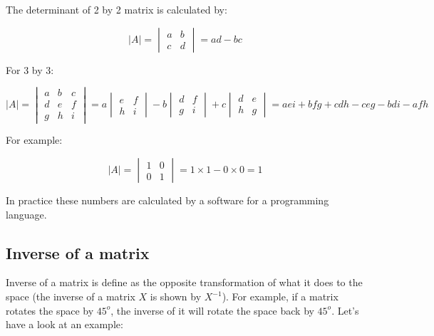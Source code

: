 \documentclass[
]{book}
\theoremstyle{definition}
\theoremstyle{definition}
\theoremstyle{definition}
\theoremstyle{remark}
\begin{document}
The determinant of 2 by 2 matrix is calculated by:

\[|A|=\begin{vmatrix} a & b \\ c & d \end{vmatrix}=
  ad-bc\]

For 3 by 3:

\[|A|=\begin{vmatrix} a & b &c \\ d & e & f\\g & h &i \end{vmatrix}=
  a\begin{vmatrix} e & f \\ h & i \end{vmatrix}-b\begin{vmatrix} d & f \\ g & i \end{vmatrix}+c\begin{vmatrix} d & e \\ h & g \end{vmatrix}=
  aei+bfg+cdh-ceg-bdi-afh\]

For example:

\[|A|=\begin{vmatrix} 1 & 0\\ 0 & 1 \end{vmatrix}=
  1 \times 1-0 \times 0=1\]

In practice these numbers are calculated by a software for a programming language.

\hypertarget{inverse-of-a-matrix}{%
\subsection{Inverse of a matrix}\label{inverse-of-a-matrix}}

Inverse of a matrix is define as the opposite transformation of what it does to the space (the inverse of a matrix \(X\) is shown by \(X^{-1}\)). For example, if a matrix rotates the space by \(45^o\), the inverse of it will rotate the space back by \(45^o\). Let's have a look at an example:
\end{document}

